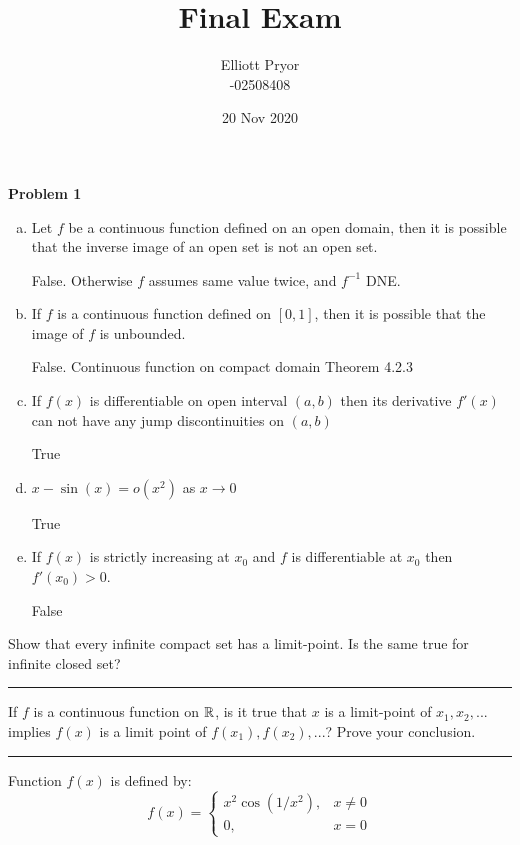 \documentclass[11pt]{article}
\title{Final Exam}
\author{Elliott Pryor\\
-02508408}
\date{20 Nov 2020}
\begin{document}
\maketitle

\large{\textbf{Problem 1}}

\begin{enumerate}[a)]
	\item Let $f$ be a continuous function defined on an open domain, then it is possible that the inverse image of an open set is not an open set.
	
	False. Otherwise $f$ assumes same value twice, and $f^{-1}$ DNE.
	
	\item If $f$ is a continuous function defined on $[0, 1]$, then it is possible that the image of $f$ is unbounded.
	
	False. Continuous function on compact domain Theorem 4.2.3
	
	\item If $f(x)$ is differentiable on open interval $(a,b)$ then its derivative $f'(x)$ can not have any jump discontinuities on $(a,b)$
	
	True
	
	\item $x - \sin(x) = o (x^2)$ as $x \to 0$
	
	True
	
	\item If $f(x)$ is strictly increasing at $x_0$ and $f$ is differentiable at $x_0$ then $f'(x_0) > 0$.
	
	False

\end{enumerate}


Show that every infinite compact set has a limit-point. Is the same true for infinite closed
set?

\hrule






If $f$ is a continuous function on $\mathbb{R}$, is it true that $x$ is a limit-point of $x_1, x_2, ...$ implies $f(x)$ is a limit point of $f(x_1), f(x_2), ...$? Prove your conclusion.

\hrule







Function $f(x)$ is defined by:
$$f(x) = \begin{cases}
x^2 \cos(1/x^2), & x \neq 0\\
0, & x = 0
\end{cases}$$
\end{document}
